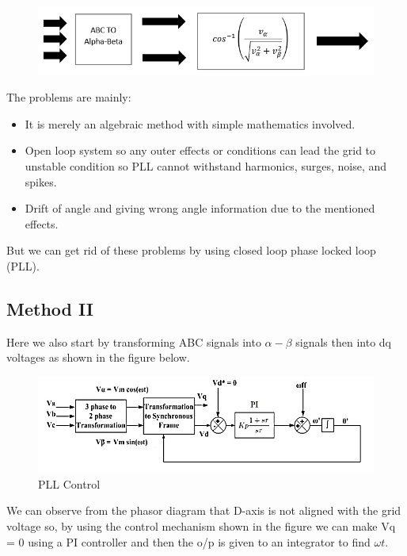 \documentclass[12pt,a4paper]{book}
\begin{document}
\begin{figure}[h]
  \centering
  \includegraphics[width=13cm]{image0.png}
  \label{fig:image0}
\end{figure}

The problems are mainly:
\begin{itemize}
  \item It is merely an algebraic method with simple mathematics involved.
  \item Open loop system so any outer effects or conditions can lead the grid to unstable condition so PLL cannot withstand harmonics, surges, noise, and spikes.
  \item Drift of angle and giving wrong angle information due to the mentioned effects.
\end{itemize}
But we can get rid of these problems by using closed loop phase locked loop (PLL).

\subsection{Method II}
Here we also start by transforming ABC signals into \(\alpha - \beta\) signals then into dq voltages as shown in the figure below.

\begin{figure}[h]
  \centering
  \includegraphics[width=13cm]{image14.png}
  \caption{PLL Control}
  \label{fig:image14}
\end{figure}

We can observe from the phasor diagram that D-axis is not aligned with the grid voltage so, by using the control mechanism shown in the figure we can make Vq = 0 using a PI controller and then the o/p is given to an integrator to find \(\omega t\).
\end{document}

